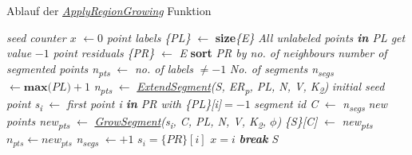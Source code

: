 \begin{algorithm}
	\caption{Ablauf der \textit{\hyperref[alg:apply_region_growing]{ApplyRegionGrowing}} Funktion}
	\label{alg:apply_region_growing}
	\begin{algorithmic}[1]
		\State \textit{seed counter $x$} $\gets 0$
		\State \textit{point labels \{PL\}} $\gets$ \textbf{size}\textit{\{E\}}
		\State \textit{All unlabeled points \textbf{in} PL get value }$-1$
		\State \textit{point residuals \{PR\}} $\gets$ \textit{E}
		\State \textbf{sort} \textit{PR by no. of neighbours}
		\State \textit{number of segmented points n\textsubscript{pts}} $\gets$ \textit{no. of labels} $\neq -1$
		\State \textit{No. of segments n\textsubscript{segs}} $\gets \textbf{max}\textit{(PL)} + 1$
		\State \textit{n\textsubscript{pts}} $\gets$ \textit{\hyperref[alg: extend_segments]{ExtendSegment}(S, ER\textsubscript{p}, PL, N, V, K\textsubscript{2})}
		\State \textit{initial seed point s\textsubscript{i}} $\gets$ \textit{first point i \textbf{in} PR with \{PL\}[i]}$= -1$
		\State \textit{segment id C} $\gets$ \textit{n\textsubscript{segs}}
		\State \textit{new points new\textsubscript{pts}} $\gets$ \textit{\hyperref[alg:grow_segment]{GrowSegment}(s\textsubscript{i}, C, PL, N, V,  K\textsubscript{2}, $\phi$)}
		\State \textit{\{S\}[C]} $\gets$ \textit{new\textsubscript{pts}}
		\State $n_{pts} \gets new_{pts}$
		\State \textit{n\textsubscript{segs}} $\gets + 1$
		\State $s_i = \{PR\}[i]$
		\State $x = i$
		\State \textit{\textbf{break}}
		\EndIf
		\EndFor
		\EndWhile
		\State \Return \textit{S}
		\EndFunction
	\end{algorithmic}
\end{algorithm}

